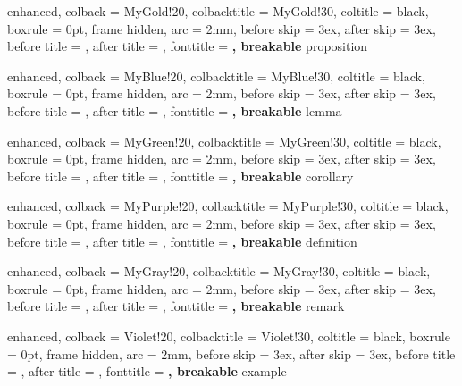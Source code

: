 %
  {enhanced,
   colback        = MyGold!20,
   colbacktitle   = MyGold!30,
   coltitle       = black,
   boxrule        = 0pt,
   frame hidden,
   arc            = 2mm,
   before skip    = 3ex,
   after skip     = 3ex,
   before title   = {\vspace{2mm}},
   after title    = {\vspace{2mm}},
   fonttitle      = \bfseries\sffamily,
   breakable
  }{proposition}

%
  {enhanced,
   colback        = MyBlue!20,
   colbacktitle   = MyBlue!30,
   coltitle       = black,
   boxrule        = 0pt,
   frame hidden,
   arc            = 2mm,
   before skip    = 3ex,
   after skip     = 3ex,
   before title   = {\vspace{2mm}},
   after title    = {\vspace{2mm}},
   fonttitle      = \bfseries\sffamily,
   breakable
  }{lemma}

%
  {enhanced,
   colback        = MyGreen!20,
   colbacktitle   = MyGreen!30,
   coltitle       = black,
   boxrule        = 0pt,
   frame hidden,
   arc            = 2mm,
   before skip    = 3ex,
   after skip     = 3ex,
   before title   = {\vspace{2mm}},
   after title    = {\vspace{2mm}},
   fonttitle      = \bfseries\sffamily,
   breakable
  }{corollary}

%
  {enhanced,
   colback        = MyPurple!20,
   colbacktitle   = MyPurple!30,
   coltitle       = black,
   boxrule        = 0pt,
   frame hidden,
   arc            = 2mm,
   before skip    = 3ex,
   after skip     = 3ex,
   before title   = {\vspace{2mm}},
   after title    = {\vspace{2mm}},
   fonttitle      = \bfseries\sffamily,
   breakable
  }{definition}

%
  {enhanced,
   colback        = MyGray!20,
   colbacktitle   = MyGray!30,
   coltitle       = black,
   boxrule        = 0pt,
   frame hidden,
   arc            = 2mm,
   before skip    = 3ex,
   after skip     = 3ex,
   before title   = {\vspace{2mm}},
   after title    = {\vspace{2mm}},
   fonttitle      = \bfseries\sffamily,
   breakable
  }{remark}

%
  {enhanced,
   colback        = Violet!20,
   colbacktitle   = Violet!30,
   coltitle       = black,
   boxrule        = 0pt,
   frame hidden,
   arc            = 2mm,
   before skip    = 3ex,
   after skip     = 3ex,
   before title   = {\vspace{2mm}},
   after title    = {\vspace{2mm}},
   fonttitle      = \bfseries\sffamily,
   breakable
  }{example}

